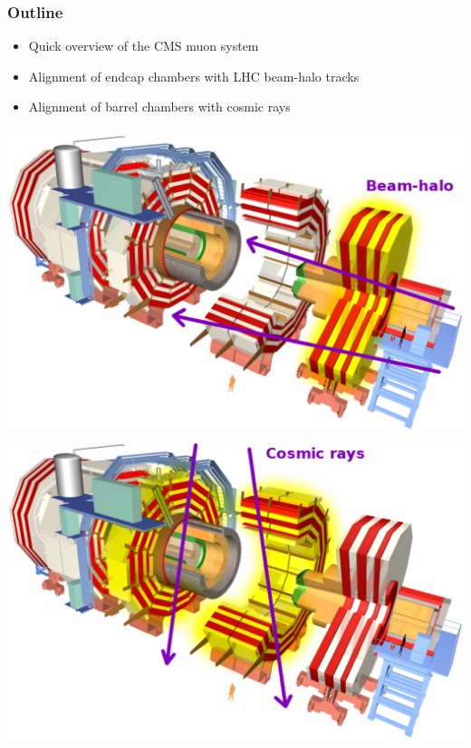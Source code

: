 \documentclass[compress]{beamer}
\begin{document}
\begin{frame}
\frametitle{Outline}
\begin{itemize}\setlength{\itemsep}{0.65 cm}
\item Quick overview of the CMS muon system

\item Alignment of endcap chambers with LHC beam-halo tracks

\item Alignment of barrel chambers with cosmic rays
\end{itemize}

\vfill
\includegraphics[width=0.47\linewidth]{CMS_exploded_endcap.png} \hfill \includegraphics[width=0.47\linewidth]{CMS_exploded_barrel.png}
\end{frame}
\end{document}
